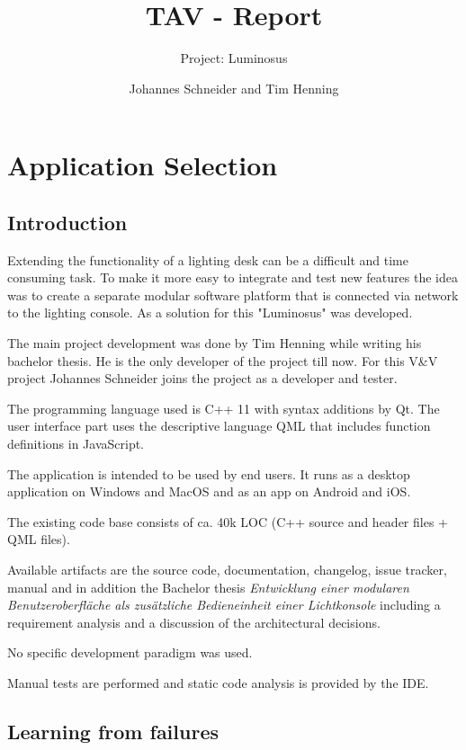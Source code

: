 \documentclass{scrartcl}
\title{TAV - Report}
\subtitle{Project: Luminosus}
\author{Johannes Schneider and Tim Henning}
\begin{document}
\maketitle

\setcounter{section}{-1}
\section{Application Selection}

\subsection{Introduction}

Extending the functionality of a lighting desk can be a difficult and time consuming task. To make it more easy to integrate and test new features the idea was to create a separate modular software platform that is connected via network to the lighting console. As a solution for this "Luminosus" was developed.

The main project development was done by Tim Henning while writing his bachelor thesis. He is the only developer of the project till now. For this V\&V project Johannes Schneider joins the project as a developer and tester.

The programming language used is C++ 11 with syntax additions by Qt. The user interface part uses the descriptive language QML that includes function definitions in JavaScript.

The application is intended to be used by end users. It runs as a desktop application on Windows and MacOS and as an app on Android and iOS.

The existing code base consists of ca. 40k LOC (C++ source and header files + QML files).

Available artifacts are the source code, documentation, changelog, issue tracker, manual and in addition the Bachelor thesis \textit{Entwicklung einer modularen Benutzeroberfl\"ache als zus\"atzliche Bedieneinheit einer Lichtkonsole} including a requirement analysis and a discussion of the architectural decisions.

No specific development paradigm was used.

Manual tests are performed and static code analysis is provided by the IDE.

\subsection{Learning from failures}
\end{document}
